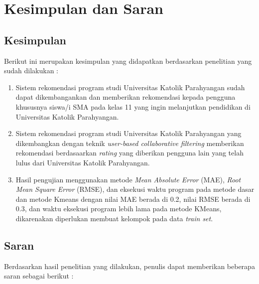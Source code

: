 \chapter{Kesimpulan dan Saran}
\label{chap:kesimpulan dan saran}

\section{Kesimpulan}
\label{sec:kesimpulan}

Berikut ini merupakan kesimpulan yang didapatkan berdasarkan penelitian yang sudah dilakukan :

\begin{enumerate}
    \item Sistem rekomendasi program studi Universitas Katolik Parahyangan sudah dapat dikembangankan dan memberikan rekomendasi kepada pengguna khususnya siswa/i SMA pada kelas 11 yang ingin melanjutkan pendidikan di Universitas Katolik Parahyangan.
    
    \item Sistem rekomendasi program studi Universitas Katolik Parahyangan yang dikembangkan dengan teknik \textit{user-based collaborative filtering} memberikan rekomendasi berdasaarkan \textit{rating} yang diberikan pengguna lain yang telah lulus dari Universitas Katolik Parahyangan.
    
    \item Hasil pengujian menggunakan metode \textit{Mean Absolute Error} (MAE), \textit{Root Mean Square Error} (RMSE), dan eksekusi waktu program pada metode dasar dan metode Kmeans dengan nilai MAE berada di 0.2, nilai RMSE berada di 0.3, dan waktu eksekusi program lebih lama pada metode KMeans, dikarenakan diperlukan membuat kelompok pada data \textit{train set}.
    
\end{enumerate}

\section{Saran}
\label{sec:saran}

Berdasarkan hasil penelitian yang dilakukan, penulis dapat memberikan beberapa saran sebagai berikut :

